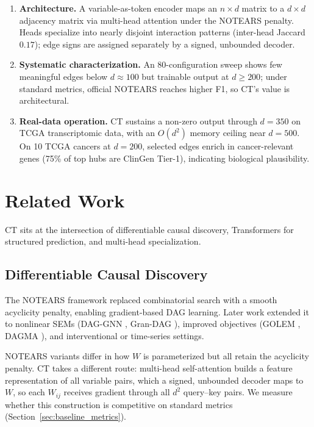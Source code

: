 \documentclass[12pt,a4paper]{article}
\begin{document}
\begin{enumerate}
    \item \textbf{Architecture.} A variable-as-token encoder maps an $n\times d$ matrix to a $d\times d$ adjacency matrix via multi-head attention under the NOTEARS penalty. Heads specialize into nearly disjoint interaction patterns (inter-head Jaccard $0.17$); edge signs are assigned separately by a signed, unbounded decoder.
    \item \textbf{Systematic characterization.} An 80-configuration sweep shows few meaningful edges below $d\approx100$ but trainable output at $d\ge200$; under standard metrics, official NOTEARS reaches higher F1, so CT's value is architectural.
    \item \textbf{Real-data operation.} CT sustains a non-zero output through $d=350$ on TCGA transcriptomic data, with an $O(d^2)$ memory ceiling near $d=500$. On 10 TCGA cancers at $d=200$, selected edges enrich in cancer-relevant genes (75\% of top hubs are ClinGen Tier-1), indicating biological plausibility.
\end{enumerate}

\section{Related Work}

CT sits at the intersection of differentiable causal discovery, Transformers for structured prediction, and multi-head specialization.

\subsection{Differentiable Causal Discovery}

The NOTEARS framework \cite{zheng2018dags} replaced combinatorial search with a smooth acyclicity penalty, enabling gradient-based DAG learning. Later work extended it to nonlinear SEMs (DAG-GNN \cite{yu2019daggnn}, Gran-DAG \cite{lachapelle2020gradient}), improved objectives (GOLEM \cite{ng2020golem}, DAGMA \cite{bello2022dagma}), and interventional \cite{brouillard2020differentiable} or time-series \cite{pamfil2020dynotears} settings.

NOTEARS variants differ in how $W$ is parameterized but all retain the acyclicity penalty. CT takes a different route: multi-head self-attention builds a feature representation of all variable pairs, which a signed, unbounded decoder maps to $W$, so each $W_{ij}$ receives gradient through all $d^2$ query--key pairs. We measure whether this construction is competitive on standard metrics (Section~\ref{sec:baseline_metrics}).
\end{document}
